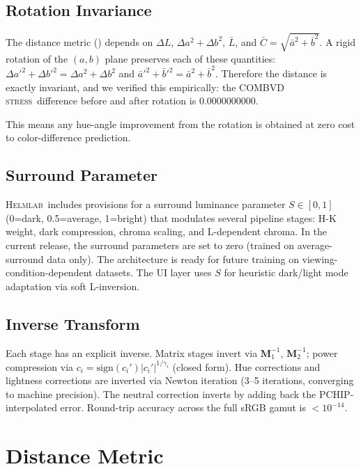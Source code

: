 \documentclass[11pt, twocolumn]{article}
\newcommand{\helmlab}{\textsc{Helmlab}}
\newcommand{\stress}{\textsc{stress}}
\begin{document}
\subsection{Rotation Invariance}
\label{sec:rotation-proof}

The distance metric () depends on
$\Delta L$, $\Delta a^2 + \Delta b^2$, $\bar{L}$, and
$\bar{C} = \sqrt{\bar{a}^2 + \bar{b}^2}$. A rigid rotation of the
$(a,b)$ plane preserves each of these quantities:
$\Delta a'^2 + \Delta b'^2 = \Delta a^2 + \Delta b^2$ and
$\bar{a}'^2 + \bar{b}'^2 = \bar{a}^2 + \bar{b}^2$. Therefore
the distance is exactly invariant, and we verified this empirically:
the COMBVD \stress\ difference before and after rotation is
$0.0000000000$.

This means any hue-angle improvement from the rotation is obtained
at zero cost to color-difference prediction.

\subsection{Surround Parameter}
\label{sec:surround}

\helmlab\ includes provisions for a surround luminance parameter
$S \in [0, 1]$ (0=dark, 0.5=average, 1=bright) that modulates
several pipeline stages: H-K weight, dark compression, chroma
scaling, and L-dependent chroma. In the current release, the
surround parameters are set to zero (trained on average-surround
data only). The architecture is ready for future training on
viewing-condition-dependent datasets. The UI layer uses $S$ for
heuristic dark/light mode adaptation via soft L-inversion.

\subsection{Inverse Transform}

Each stage has an explicit inverse. Matrix stages invert via
$\mathbf{M}_1^{-1}$, $\mathbf{M}_2^{-1}$; power compression
via $c_i = \mathrm{sign}(c_i')|c_i'|^{1/\gamma_i}$ (closed form).
Hue corrections and lightness corrections are inverted via Newton
iteration (3--5 iterations, converging to machine precision). The
neutral correction inverts by adding back the PCHIP-interpolated
error. Round-trip accuracy across the full sRGB gamut is
$< 10^{-14}$.


\section{Distance Metric}
\label{sec:distance}
\end{document}
